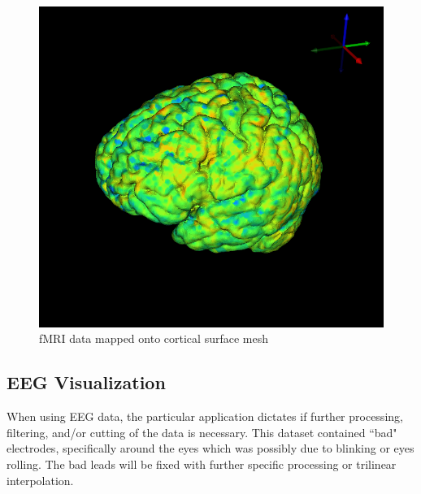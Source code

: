 \begin{figure}[H]
\begin{center}
\includegraphics[width=.75\textwidth]{Figures/fmri_1}
\caption{fMRI data mapped onto cortical surface mesh}
\label{fig:fmrivis}
\end{center}
\end{figure}

\subsection{EEG Visualization}

When using EEG data, the particular application dictates if further processing, filtering, and/or cutting of the data is necessary. This dataset contained ``bad" electrodes, specifically around the eyes which was possibly due to blinking or eyes rolling. The bad leads will be fixed with further specific processing or trilinear interpolation.

